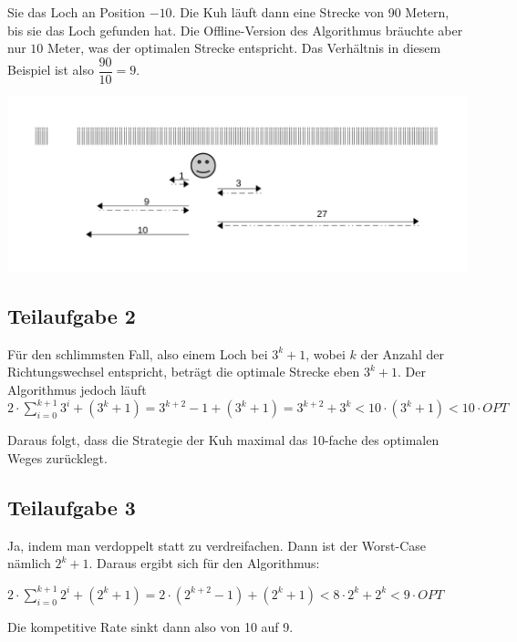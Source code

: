 \documentclass[a4paper, fontsize=10pt]{scrartcl}
\begin{document}
Sie das Loch an Position $-10$. Die Kuh läuft dann eine Strecke von 90 Metern, bis sie das Loch gefunden hat. Die Offline-Version des Algorithmus bräuchte aber nur $10$ Meter, was der optimalen Strecke entspricht. Das Verhältnis in diesem Beispiel ist also $\dfrac{90}{10}=9$.

\begin{center}
    \includegraphics[scale=0.7]{aufgabe2a.pdf}
  \end{center}
  

\subsection*{Teilaufgabe 2}

Für den schlimmsten Fall, also einem Loch bei $3^k+1$, wobei $k$ der Anzahl der Richtungswechsel entspricht, beträgt die optimale Strecke eben $3^k+1$. Der Algorithmus jedoch läuft\\
$2\cdot\sum\nolimits_{i=0}^{k+1}3^i+(3^k+1)=3^{k+2}-1+(3^k+1)=3^{k+2}+3^{k}<10\cdot (3^k+1)<10\cdot OPT$\smallskip

Daraus folgt, dass die Strategie der Kuh maximal das 10-fache des optimalen Weges zurücklegt.

\subsection*{Teilaufgabe 3}

Ja, indem man verdoppelt statt zu verdreifachen. Dann ist der Worst-Case nämlich $2^k+1$. Daraus ergibt sich für den Algorithmus:\smallskip

$2\cdot \sum\nolimits_{i=0}^{k+1}2^i+(2^k+1)=2\cdot(2^{k+2}-1)+(2^k+1)<8\cdot 2^k+2^k<9\cdot OPT$\smallskip


Die kompetitive Rate sinkt dann also von 10 auf 9.
\end{document}
